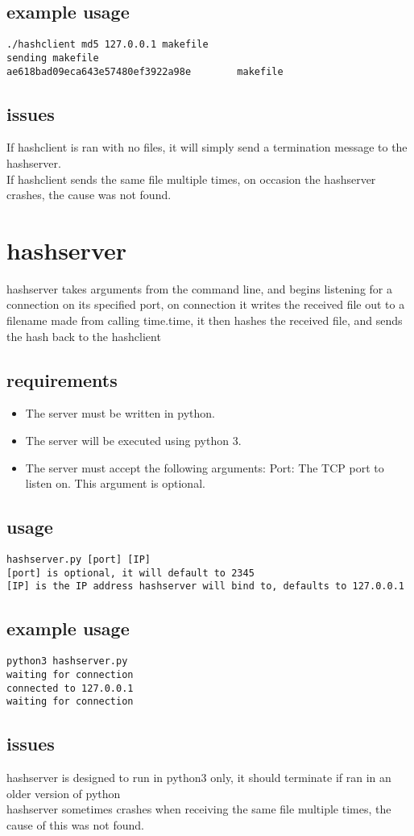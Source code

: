 \documentclass[12pt]{article}
\begin{document}
\subsection{example usage}
\begin{verbatim}
./hashclient md5 127.0.0.1 makefile
sending makefile
ae618bad09eca643e57480ef3922a98e		makefile
\end{verbatim}
\subsection{issues}
If hashclient is ran with no files, it will simply send a termination message to the hashserver.\\
If hashclient sends the same file multiple times, on occasion the hashserver crashes, the cause was not found.
\section{hashserver}
hashserver takes arguments from the command line, and begins listening for a connection on its specified port, on connection it writes the received file out to a filename made from calling time.time, it then hashes the received file, and sends the hash back to the hashclient
\subsection{requirements}
\begin{itemize}
	\item The server must be written in python. 
	\item The server will be executed using python 3.
	\item The server must accept the following arguments:
	\subitem Port: The TCP port to listen on. This argument is optional.
\end{itemize}
\subsection{usage}
\begin{verbatim}
hashserver.py [port] [IP]
[port] is optional, it will default to 2345 
[IP] is the IP address hashserver will bind to, defaults to 127.0.0.1
\end{verbatim}
\subsection{example usage}
\begin{verbatim}
python3 hashserver.py
waiting for connection
connected to 127.0.0.1
waiting for connection
\end{verbatim}
\subsection{issues}
hashserver is designed to run in python3 only, it should terminate if ran in an older version of python\\
hashserver sometimes crashes when receiving the same file multiple times, the cause of this was not found.
\end{document}
